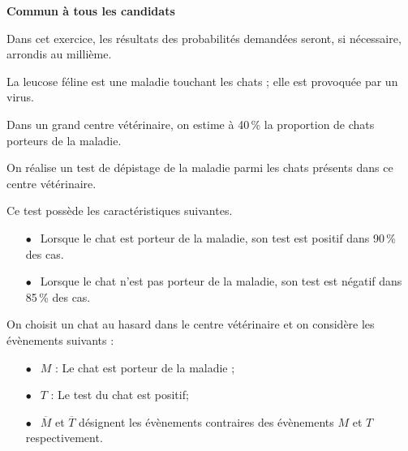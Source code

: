 
\textbf{Commun à tous les candidats}

\medskip

Dans cet exercice, les résultats des probabilités demandées seront, si nécessaire, arrondis au millième.

La leucose féline est une maladie touchant les chats ; elle est provoquée par un virus.

Dans un grand centre vétérinaire, on estime à 40\,\% la proportion de chats porteurs de la maladie.

On réalise un test de dépistage de la maladie parmi les chats présents dans ce centre vétérinaire.

Ce test possède les caractéristiques suivantes.

\setlength\parindent{9mm}
\begin{itemize}
\item[$\bullet~~$] Lorsque le chat est porteur de la maladie, son test est positif dans 90\,\% des cas.
\item[$\bullet~~$] Lorsque le chat n'est pas porteur de la maladie, son test est négatif dans 85\,\% des cas.
\end{itemize}
\setlength\parindent{0mm}

On choisit un chat au hasard dans le centre vétérinaire et on considère les évènements suivants :

\setlength\parindent{9mm}
\begin{itemize}
\item[$\bullet~~$] $M$ : \og Le chat est porteur de la maladie\fg{} ;
\item[$\bullet~~$] $T$ : \og Le test du chat est positif\fg ;
\item[$\bullet~~$] $\overline{M}$ et $\overline{T}$ désignent les évènements contraires des évènements $M$ et $T$ respectivement.
\end{itemize}
\setlength\parindent{0mm}

\medskip

